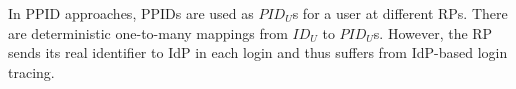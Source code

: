 






In PPID approaches, PPIDs are used as $PID_U$s for a user at different RPs. There are deterministic one-to-many mappings from $ID_U$ to $PID_U$s.
However, the RP sends its real identifier to IdP in each login and thus suffers from IdP-based login tracing.


